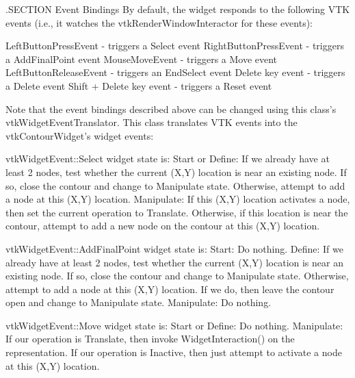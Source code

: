 .S\-E\-C\-T\-I\-O\-N Event Bindings By default, the widget responds to the following V\-T\-K events (i.\-e., it watches the vtk\-Render\-Window\-Interactor for these events)\-: 
\begin{DoxyPre}
   LeftButtonPressEvent - triggers a Select event
   RightButtonPressEvent - triggers a AddFinalPoint event
   MouseMoveEvent - triggers a Move event
   LeftButtonReleaseEvent - triggers an EndSelect event
   Delete key event - triggers a Delete event
   Shift + Delete key event - triggers a Reset event
 \end{DoxyPre}


Note that the event bindings described above can be changed using this class's vtk\-Widget\-Event\-Translator. This class translates V\-T\-K events into the vtk\-Contour\-Widget's widget events\-: 
\begin{DoxyPre}
   vtkWidgetEvent::Select 
        widget state is: 
            Start or
            Define: If we already have at least 2 nodes, test
                 whether the current (X,Y) location is near an existing
                 node. If so, close the contour and change to Manipulate
                 state. Otherwise, attempt to add a node at this (X,Y)
                 location.
            Manipulate: If this (X,Y) location activates a node, then
                 set the current operation to Translate. Otherwise, if
                 this location is near the contour, attempt to add a 
                 new node on the contour at this (X,Y) location.\end{DoxyPre}



\begin{DoxyPre}   vtkWidgetEvent::AddFinalPoint
        widget state is: 
            Start: Do nothing.
            Define: If we already have at least 2 nodes, test
                 whether the current (X,Y) location is near an existing
                 node. If so, close the contour and change to Manipulate
                 state. Otherwise, attempt to add a node at this (X,Y)
                 location. If we do, then leave the contour open and
                 change to Manipulate state.
            Manipulate: Do nothing.\end{DoxyPre}



\begin{DoxyPre}   vtkWidgetEvent::Move
        widget state is: 
            Start or
            Define: Do nothing.
            Manipulate: If our operation is Translate, then invoke
                  WidgetInteraction() on the representation. If our 
                  operation is Inactive, then just attempt to activate
                  a node at this (X,Y) location.\end{DoxyPre}



